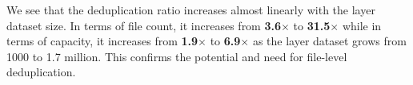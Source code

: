 We see that the deduplication ratio increases almost linearly with the layer dataset size.
%
In terms of file count, it increases from \textbf{3.6$\times$} to \textbf{31.5$\times$} while
in terms of capacity, it increases from \textbf{1.9$\times$} to
\textbf{6.9$\times$} as the layer dataset grows from 1000 to 1.7 million.
%
This confirms the potential and need for file-level deduplication.
%
